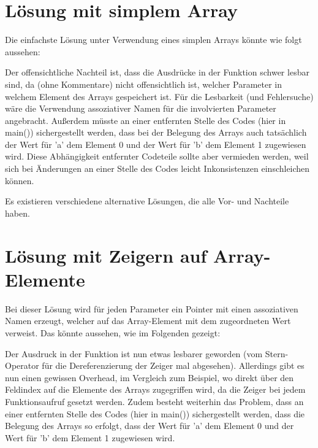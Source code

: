 \section{Lösung mit simplem Array}
Die einfachste Lösung unter Verwendung eines simplen Arrays könnte wie folgt aussehen:

\begin{shaded}
  \scriptsize
  
\end{shaded}

Der offensichtliche Nachteil ist, dass die Ausdrücke in der Funktion schwer lesbar sind, da (ohne Kommentare) nicht offensichtlich ist, welcher Parameter in welchem Element des Arrays gespeichert ist. Für die Lesbarkeit (und Fehlersuche) wäre die Verwendung assoziativer Namen für die involvierten Parameter angebracht. Außerdem müsste an einer entfernten Stelle des Codes (hier in main()) sichergestellt werden, dass bei der Belegung des Arrays auch tatsächlich der Wert für 'a' dem Element 0 und der Wert für 'b' dem Element 1 zugewiesen wird. Diese Abhängigkeit entfernter Codeteile sollte aber vermieden werden, weil sich bei Änderungen an einer Stelle des Codes leicht Inkonsistenzen einschleichen können.

Es existieren verschiedene alternative Lösungen, die alle Vor- und Nachteile haben.

\section{Lösung mit Zeigern auf Array-Elemente}
Bei dieser Lösung wird für jeden Parameter ein Pointer mit einen assoziativen Namen erzeugt, welcher auf das Array-Element mit dem zugeordneten Wert verweist. Das könnte aussehen, wie im Folgenden gezeigt:

\begin{shaded}
  \scriptsize
  
\end{shaded}

Der Ausdruck in der Funktion ist nun etwas lesbarer geworden (vom Stern-Operator für die Dereferenzierung der Zeiger mal abgesehen). Allerdings gibt es nun einen gewissen Overhead, im Vergleich zum Beispiel, wo direkt über den Feldindex auf die Elemente des Arrays zugegriffen wird, da die Zeiger bei jedem Funktionsaufruf gesetzt werden. Zudem besteht weiterhin das Problem, dass an einer entfernten Stelle des Codes (hier in main()) sichergestellt werden, dass die Belegung des Arrays so erfolgt, dass der Wert für 'a' dem Element 0 und der Wert für 'b' dem Element 1 zugewiesen wird.

